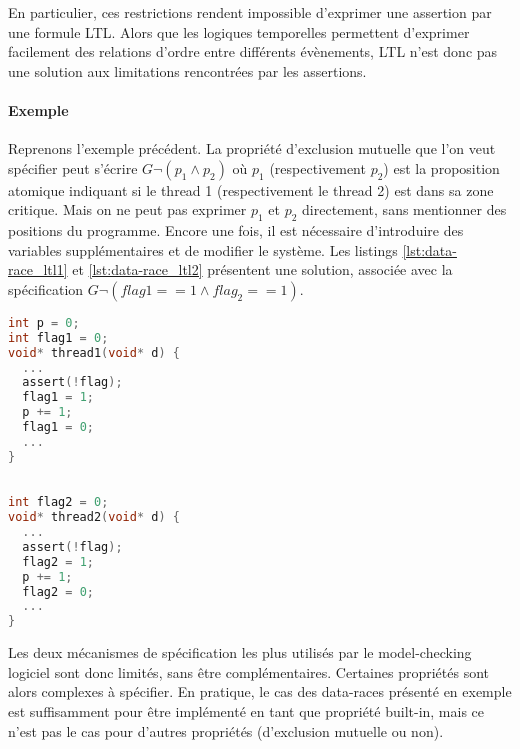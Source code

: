 En particulier, ces restrictions rendent impossible d'exprimer une assertion par
une formule \ac{LTL}. Alors que les logiques temporelles permettent d'exprimer
facilement des relations d'ordre entre différents évènements, \ac{LTL} n'est donc
pas une solution aux limitations rencontrées par les assertions.

\paragraph{Exemple}
Reprenons l'exemple précédent. La propriété d'exclusion mutuelle que l'on veut
spécifier peut s'écrire \(G \lnot (p_1 \land p_2)\) où \(p_1\) (respectivement
\(p_2\)) est la proposition atomique indiquant si le thread 1 (respectivement le
thread 2) est dans sa zone critique. Mais on ne peut pas exprimer \(p_1\) et \(p_2\)
directement, sans mentionner des positions du programme. Encore une fois, il est
nécessaire d'introduire des variables supplémentaires et de modifier le système.
Les listings \ref{lst:data-race_ltl1} et \ref{lst:data-race_ltl2} présentent une
solution, associée avec la spécification \(G \lnot (flag1 == 1 \land flag_2 ==
1)\).

\noindent\begin{minipage}{.45\textwidth}
  \begin{lstlisting}[language=C, frame=single, caption=Thread 1,
    label=lst:data-race_ltl1]
int p = 0;
int flag1 = 0;
void* thread1(void* d) {
  ...
  assert(!flag);
  flag1 = 1;
  p += 1;
  flag1 = 0;
  ...
}
\end{lstlisting}
\end{minipage}\hfill
\begin{minipage}{.45\textwidth}
\begin{lstlisting}[language=C, frame=single, caption=Thread 2,
    label=lst:data-race_ltl2]

int flag2 = 0;
void* thread2(void* d) {
  ...
  assert(!flag);
  flag2 = 1;
  p += 1;
  flag2 = 0;
  ...
}
\end{lstlisting}
\end{minipage}

Les deux mécanismes de spécification les plus utilisés par le model-checking
logiciel sont donc limités, sans être complémentaires. Certaines propriétés sont
alors complexes à spécifier. En pratique, le cas des data-races présenté en
exemple est suffisamment pour être implémenté en tant que propriété built-in,
mais ce n'est pas le cas pour d'autres propriétés (d'exclusion mutuelle ou non).

